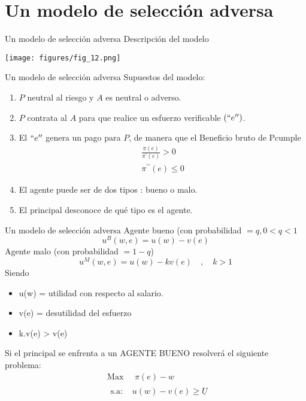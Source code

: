 \section[Modelo]{Un modelo de selección adversa}
\begin{frame}{Un modelo de selección adversa}
	Descripción del modelo
		\begin{center}
			\texttt{[image: figures/fig\_12.png]}
		\end{center}
\end{frame}
\begin{frame}{Un modelo de selección adversa}
	Supuestos del modelo:
		\begin{enumerate}
			\item $P$ neutral al riesgo y $A$ es neutral o adverso.
			\item $P$ contrata al $A$ para que realice un esfuerzo verificable $(``e'')$.
			\item El $``e''$ genera un pago para $P$, de manera que el Beneficio bruto de P$ $cumple
					\begin{gather*}
						\frac{\pi(e)}{\pi^{\prime}(e)} > 0\\
						\pi^{\prime\prime}(e) \leq 0
					\end{gather*}
			\item El agente puede ser de dos tipos : bueno o malo.
			\item El principal desconoce de qué tipo es el agente.
		\end{enumerate}
\end{frame}
\begin{frame}{Un modelo de selección adversa}
	Agente bueno (con probabilidad $=q, 0<q<1$
		$$u^B(w,e) = u(w) - v(e)$$
	Agente malo (con probabilidad $= 1 -q$)
		$$u^M(w,e)=u(w)-kv(e) \quad , \quad k > 1$$
	Siendo
		\begin{itemize}
			\item u(w) = utilidad con respecto al salario.
			\item v(e) = desutilidad del esfuerzo
			\item k.v(e) > v(e)
		\end{itemize}
	Si el principal se enfrenta a un AGENTE BUENO resolverá el siguiente problema:
		\begin{align*}
			& \text{Max } \quad  \pi(e) - w\\
			& \begin{array}{ll}
				\text{s.a: } & u(w) - v(e) \geq \underline{U}
			\end{array}
		\end{align*}
\end{frame}
